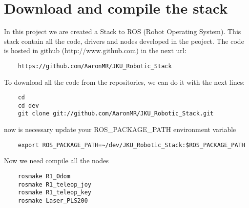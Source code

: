 \chapter{Download and compile the stack}

In this project we are created a Stack to ROS (Robot Operating System). This stack contain all the code, drivers and nodes developed in the peoject.
The code is hosted in github (http://www.github.com) in the next url: 
\begin{verbatim}
    https://github.com/AaronMR/JKU_Robotic_Stack
\end{verbatim}

To download all the code from the repositories, we can do it with the next lines:

\begin{verbatim}
    cd
    cd dev
    git clone git://github.com/AaronMR/JKU_Robotic_Stack.git
\end{verbatim}


now is necessary update your ROS\_PACKAGE\_PATH environment variable

\begin{verbatim}
    export ROS_PACKAGE_PATH=~/dev/JKU_Robotic_Stack:$ROS_PACKAGE_PATH
\end{verbatim}

Now we need compile all the nodes

\begin{verbatim}
    rosmake R1_Odom
    rosmake R1_teleop_joy
    rosmake R1_teleop_key
    rosmake Laser_PLS200
\end{verbatim}
